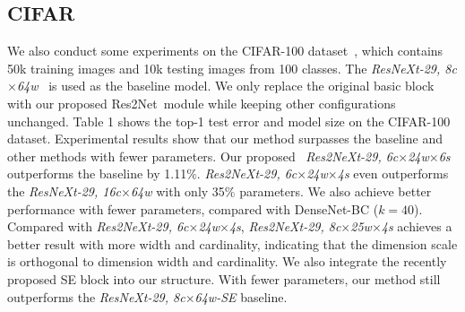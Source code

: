 \documentclass[10pt,journal,cspaper,compsoc]{IEEEtran}
\newcommand{\tabref}[1]{Table 1}%
\newcommand{\tabref}[1]{Table~\ref{#1}}%
\newcommand{\ourM}{{Res2Net}}
\begin{document}
\subsection{CIFAR}
\label{sec:Experiments_CIFAR}

We also conduct some experiments on the CIFAR-100
dataset~\cite{krizhevsky2009learning},
which contains 50k training images and 10k testing images from 100 classes.
The \emph{ResNeXt-29, 8c$\times$64w}~\cite{xie2017aggregated} is used
as the baseline model.
We only replace the original basic block with our proposed \ourM~module
while keeping other configurations unchanged.
\tabref{tab:cifar_prec} shows the top-1 test error and model size 
on the CIFAR-100 dataset.
Experimental results show that our method surpasses the baseline
and other methods with fewer parameters.
Our proposed ~\emph{Res2NeXt-29, 6c$\times$24w$\times$6s} outperforms
the baseline by 1.11$\%$.
\emph{Res2NeXt-29, 6c$\times$24w$\times$4s} even outperforms
the \emph{ResNeXt-29, 16c$\times$64w} with only 35$\%$ parameters.
We also achieve better performance with fewer parameters,
compared with DenseNet-BC ($k = 40$).
Compared with \emph{Res2NeXt-29, 6c$\times$24w$\times$4s},
\emph{Res2NeXt-29, 8c$\times$25w$\times$4s} achieves a better result
with more width and cardinality,
indicating that the dimension scale is orthogonal to dimension
width and cardinality.
We also integrate the recently proposed SE block into our structure.
%
With fewer parameters,
our method still outperforms the \emph{ResNeXt-29, 8c$\times$64w-SE} baseline.


\newcommand{\WideResNet}{{Wide ResNet~\cite{Zagoruyko2016WRN}}}
\newcommand{\ResNeXtBase}{{ResNeXt-29, 8c$\times$64w~\cite{xie2017aggregated} (base)}}
\newcommand{\ResNeXtLarge}{{ResNeXt-29, 16c$\times$64w~\cite{xie2017aggregated}}}
\newcommand{\ResNeXtSEs}{{ResNeXt-29, 8c$\times$64w-SE~\cite{hu2018senet}}}
\newcommand{\DenseNetBC}{{DenseNet-BC (k = 40)~\cite{huang2017densely}}}
\newcommand{\RessNetTms}[3]{Res2NeXt-29, {#1}c$\times${#2}w$\times${#3}s}
\newcommand{\RessNetTmsSE}[3]{Res2NeXt-29, {#1}c$\times${#2}w$\times${#3}s-SE}
\end{document}
